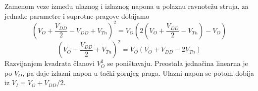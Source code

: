 Zamenom veze između ulaznog i izlaznog napona u polaznu ravnotežu struja, za jednake parametre i suprotne pragove dobijamo
\[\left(V_O+\frac{V_{DD}}2-V_{DD}+V_{Tn}\right)^2=V_O\left(2\left(V_O+\frac{V_{DD}}2-V_{Tn}\right)-V_O\right)\]
\[\left(V_O-\frac{V_{DD}}2+V_{Tn}\right)^2=V_O(V_O+V_{DD}-2V_{Tn})\]
Razvijanjem kvadrata članovi $V_O^2$ se poništavaju. Preostala jednačina linearna je po $V_O$, pa daje izlazni napon u tački gornjeg praga. Ulazni napon se potom dobija iz $V_I=V_O+V_{DD}/2$.
